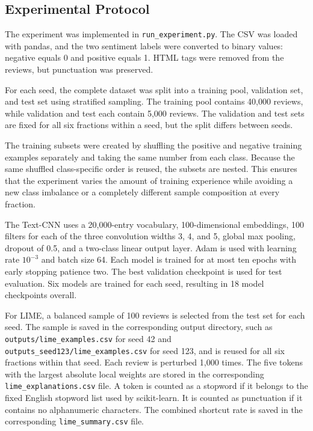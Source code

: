 \documentclass[11pt]{article}
\begin{document}
\subsection{Experimental Protocol}

The experiment was implemented in \texttt{run\_experiment.py}. The CSV was loaded with pandas, and the two sentiment labels were converted to binary values: negative equals 0 and positive equals 1. HTML tags were removed from the reviews, but punctuation was preserved.

For each seed, the complete dataset was split into a training pool, validation set, and test set using stratified sampling. The training pool contains 40,000 reviews, while validation and test each contain 5,000 reviews. The validation and test sets are fixed for all six fractions within a seed, but the split differs between seeds.

The training subsets were created by shuffling the positive and negative training examples separately and taking the same number from each class. Because the same shuffled class-specific order is reused, the subsets are nested. This ensures that the experiment varies the amount of training experience while avoiding a new class imbalance or a completely different sample composition at every fraction.

The Text-CNN uses a 20,000-entry vocabulary, 100-dimensional embeddings, 100 filters for each of the three convolution widths 3, 4, and 5, global max pooling, dropout of 0.5, and a two-class linear output layer. Adam is used with learning rate $10^{-3}$ and batch size 64. Each model is trained for at most ten epochs with early stopping patience two. The best validation checkpoint is used for test evaluation. Six models are trained for each seed, resulting in 18 model checkpoints overall.

For LIME, a balanced sample of 100 reviews is selected from the test set for each seed. The sample is saved in the corresponding output directory, such as \texttt{outputs/lime\_examples.csv} for seed 42 and \texttt{outputs\_seed123/lime\_examples.csv} for seed 123, and is reused for all six fractions within that seed. Each review is perturbed 1,000 times. The five tokens with the largest absolute local weights are stored in the corresponding \texttt{lime\_explanations.csv} file. A token is counted as a stopword if it belongs to the fixed English stopword list used by scikit-learn. It is counted as punctuation if it contains no alphanumeric characters. The combined shortcut rate is saved in the corresponding \texttt{lime\_summary.csv} file.
\end{document}
